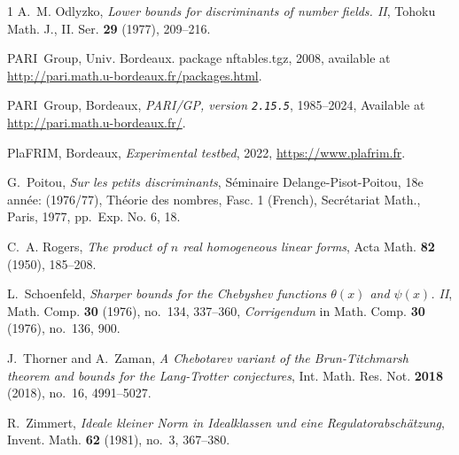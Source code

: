 \documentclass[a4paper,11pt]{amsart}
\theoremstyle{remark}
\begin{document}
\begin{thebibliography}{1}
A.~M. Odlyzko, \emph{Lower bounds for discriminants of number fields. {II}}, Tohoku
  Math. J., II. Ser. \textbf{29} (1977), 209--216.

{PARI~Group}, Univ. Bordeaux.
  package nftables.tgz, 2008,
  available at \\
  \url{http://pari.math.u-bordeaux.fr/packages.html}.

PARI~Group, Bordeaux, \emph{{PARI/GP}, version {\tt 2.15.5}}, 1985--2024,
  Available at\\
  \url{http://pari.math.u-bordeaux.fr/}.

PlaFRIM, Bordeaux, \emph{Experimental testbed}, 2022,
  \url{https://www.plafrim.fr}.

G.~Poitou, \emph{Sur les petits discriminants}, S\'{e}minaire
  {D}elange-{P}isot-{P}oitou, 18e ann\'{e}e: (1976/77), {T}h\'{e}orie des
  nombres, {F}asc. 1 ({F}rench), Secr\'{e}tariat Math., Paris, 1977, pp.~Exp.
  No. 6, 18.

C.~A. Rogers, \emph{The product of {$n$} real homogeneous linear forms},
  Acta Math. \textbf{82} (1950), 185--208.

L.~Schoenfeld, \emph{Sharper bounds for the {C}hebyshev functions {$\theta (x)$} and {$\psi (x)$}. {II}},
  Math. Comp. \textbf{30} (1976), no.~134,
  337--360, \emph{Corrigendum} in Math. Comp. \textbf{30} (1976), no.~136, 900.

J.~Thorner and A.~Zaman, \emph{A {Chebotarev} variant of the
  {Brun}-{Titchmarsh} theorem and bounds for the {Lang}-{Trotter} conjectures},
  Int. Math. Res. Not. \textbf{2018} (2018), no.~16, 4991--5027.

R.~Zimmert, \emph{Ideale kleiner {N}orm in {I}dealklassen und eine {R}egulatorabsch\"{a}tzung},
  Invent. Math. \textbf{62} (1981), no.~3, 367--380.
\end{thebibliography}
\end{document}
